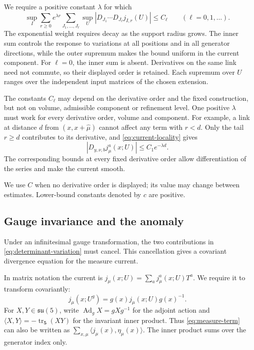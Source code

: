 \documentclass[11pt,a4paper]{article}
\theoremstyle{remark}
\DeclareMathOperator{\tr}{tr}
\DeclareMathOperator{\Ad}{Ad}
\begin{document}
We require a positive constant \(\lambda\) for which
\begin{equation}
 \sup_I\sum_{r\ge0}e^{\lambda r}
 \sum_{J_1,\ldots,J_\ell}
 \sup_U\left|D_{J_1}\cdots D_{J_\ell}j_{I,r}(U)\right|
 \le C_\ell
 \qquad(\ell=0,1,\ldots).
 \label{eq:current-locality}
\end{equation}
The exponential weight requires decay as the support radius
grows. The inner sum controls the response to variations at
all positions and in all generator directions, while the
outer supremum makes the bound uniform in the current
component. For \(\ell=0\), the inner sum is absent.
Derivatives on the same link need not commute, so their
displayed order is retained. Each supremum over \(U\)
ranges over the independent input matrices of the chosen
extension.

The constants \(C_\ell\) may depend on the derivative
order and the fixed construction, but not on volume,
admissible component or refinement level. One positive
\(\lambda\) must work for every derivative order, volume
and component. 
For example, a link at distance \(d\) from
\((x,x+\hat\mu)\) cannot affect any term with \(r<d\).
Only the tail \(r\ge d\) contributes to its derivative,
and \eqref{eq:current-locality} gives
\begin{equation}
 |D_{y,\nu,b}j_\mu^a(x;U)|\le C_1e^{-\lambda d}.
\end{equation}
The corresponding bounds at every fixed derivative order
allow differentiation of the series and make the current
smooth.

We use \(C\) when no derivative order is displayed; its
value may change between estimates. Lower-bound constants
denoted by \(c\) are positive.

\subsection{Gauge invariance and the anomaly}

Under an infinitesimal gauge transformation, the two
contributions in \eqref{eq:determinant-variation} must
cancel. This cancellation gives a covariant divergence equation for the measure current.

In matrix notation the current is
\(j_\mu(x;U)=\sum_a j_\mu^a(x;U)T^a\). We require it to
transform covariantly:
\begin{equation}
 j_\mu(x;U^g)=g(x)j_\mu(x;U)g(x)^{-1}.
\end{equation}
For \(X,Y\in\mathfrak{su}(5)\), write
\(\Ad_gX=gXg^{-1}\) for the adjoint action and
\(\langle X,Y\rangle=-\tr_{\mathbf5}(XY)\) for the
invariant inner product. Thus \eqref{eq:measure-term} can also be
written as \(\sum_{x,\mu}\langle j_\mu(x),\eta_\mu(x)\rangle\).
The inner product sums over the generator index only.
\end{document}
